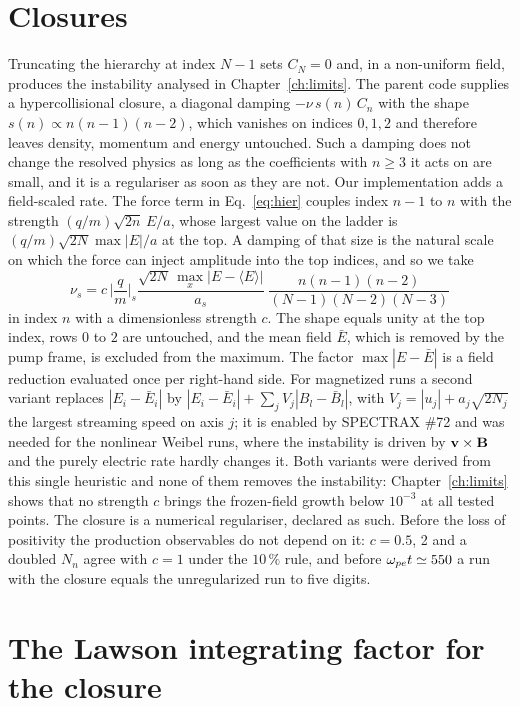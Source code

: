 \section{Closures}\label{sec:closure}

Truncating the hierarchy at index $N-1$ sets $C_N=0$ and, in a non-uniform field, produces the instability analysed in Chapter~\ref{ch:limits}. The parent code supplies a hypercollisional closure, a diagonal damping $-\nu\,s(n)\,C_n$ with the shape $s(n)\propto n(n-1)(n-2)$, which vanishes on indices $0,1,2$ and therefore leaves density, momentum and energy untouched. Such a damping does not change the resolved physics as long as the coefficients with $n\ge3$ it acts on are small, and it is a regulariser as soon as they are not. Our implementation adds a field-scaled rate. The force term in Eq.~\eqref{eq:hier} couples index $n-1$ to $n$ with the strength $(q/m)\sqrt{2n}\,E/a$, whose largest value on the ladder is $(q/m)\sqrt{2N}\max|E|/a$ at the top. A damping of that size is the natural scale on which the force can inject amplitude into the top indices, and so we take
\begin{equation}
\nu_s=c\,\Big|\frac qm\Big|_s\frac{\sqrt{2N}\,\max_x|E-\langle E\rangle|}{a_s}\;\frac{n(n-1)(n-2)}{(N-1)(N-2)(N-3)}
\label{eq:closure}
\end{equation}
in index $n$ with a dimensionless strength $c$. The shape equals unity at the top index, rows $0$ to $2$ are untouched, and the mean field $\bar E$, which is removed by the pump frame, is excluded from the maximum. The factor $\max|E-\bar E|$ is a field reduction evaluated once per right-hand side. For magnetized runs a second variant replaces $|E_i-\bar E_i|$ by $|E_i-\bar E_i|+\sum_jV_j|B_l-\bar B_l|$, with $V_j=|u_j|+a_j\sqrt{2N_j}$ the largest streaming speed on axis $j$; it is enabled by SPECTRAX \#72 and was needed for the nonlinear Weibel runs, where the instability is driven by $\mathbf{v}\times\mathbf{B}$ and the purely electric rate hardly changes it. Both variants were derived from this single heuristic and none of them removes the instability: Chapter~\ref{ch:limits} shows that no strength $c$ brings the frozen-field growth below $10^{-3}$ at all tested points. The closure is a numerical regulariser, declared as such. Before the loss of positivity the production observables do not depend on it: $c=0.5$, 2 and a doubled $N_n$ agree with $c=1$ under the $10\,\%$ rule, and before $\omega_{pe} t\simeq550$ a run with the closure equals the unregularized run to five digits.

\section{The Lawson integrating factor for the closure}\label{sec:lawson}


